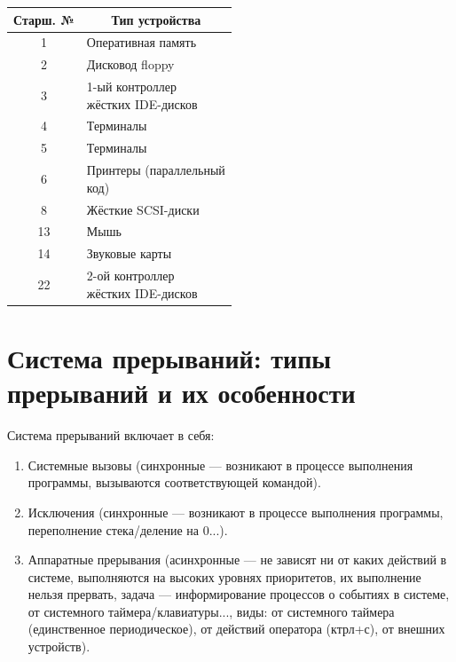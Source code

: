 \begin{table}[H]
\begin{center}
\begin{tabular}{|c|l|}
\hline
Старш. № & \multicolumn{1}{c|}{Тип устройства} \\ \hline
1             & Оперативная память                  \\ \hline
2             & Дисковод floppy                     \\ \hline
3             & \specialcell{1-ый контроллер \\ жёстких IDE-дисков}  \\ \hline
4             & Терминалы                           \\ \hline
5             & Терминалы                           \\ \hline
6             & \specialcell{Принтеры (параллельный \\ код)}         \\ \hline
8             & Жёсткие SCSI-диски                  \\ \hline
13            & Мышь                                \\ \hline
14            & Звуковые карты                      \\ \hline
22            & \specialcell{2-ой контроллер \\ жёстких IDE-дисков}  \\ \hline
\end{tabular}
\end{center}
\end{table}

\section{Система прерываний: типы прерываний и их особенности}

Система прерываний включает в себя:
\begin{enumerate}
	\item Системные вызовы (синхронные --- возникают в процессе выполнения программы, вызываются соответствующей командой).
	\item Исключения (синхронные --- возникают в процессе выполнения программы, переполнение стека/деление на 0...).
	\item Аппаратные прерывания (асинхронные --- не зависят ни от каких действий в системе, выполняются на высоких уровнях приоритетов, их выполнение нельзя прервать, задача --- информирование процессов о событиях в системе, от системного таймера/клавиатуры..., виды: от системного таймера (единственное периодическое), от действий оператора (ктрл+с), от внешних устройств).
\end{enumerate}

